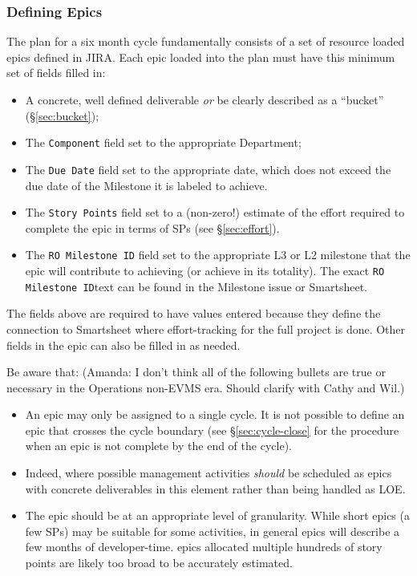 \subsubsection{Defining Epics}
\label{sec:planning-epics}

The plan for a six month \gls{cycle} fundamentally consists of a set of resource loaded \glspl{epic} defined in \gls{JIRA}.
Each \gls{epic} loaded into the plan must have this minimum set of fields filled in:

\begin{itemize}
\item
  A concrete, well defined deliverable \emph{or} be clearly described as a ``bucket'' (\S\ref{sec:bucket});
\item
  The \texttt{Component} field set to the appropriate Department;
\item
  The \texttt{Due Date} field set to the appropriate date, which does not exceed the due date of the Milestone it is labeled to achieve.
\item
  The \texttt{Story Points} field set to a (non-zero!) estimate of the effort required to complete the \gls{epic} in terms of \glspl{SP} (see \S\ref{sec:effort}).
\item
  The \texttt{RO Milestone ID} field set to the appropriate L3 or L2 milestone that the epic will contribute to achieving (or achieve in its totality).
  The exact \texttt{RO Milestone ID}text can be found in the Milestone issue or Smartsheet.
\end{itemize}

The fields above are required to have values entered because they define the connection to Smartsheet where effort-tracking for the full project is done. Other fields in the epic can also be filled in as needed. 

Be aware that: (Amanda: I don't think all of the following bullets are true or necessary in the Operations non-EVMS era.  Should clarify with Cathy and Wil.) 

\begin{itemize}
\item
  An \gls{epic} may only be assigned to a single \gls{cycle}.
  It is not possible to define an \gls{epic} that crosses the \gls{cycle} boundary (see \S\ref{sec:cycle-close} for the procedure when an \gls{epic} is not complete by the end of the \gls{cycle}).
\item
  Indeed, where possible management activities \emph{should} be scheduled as \glspl{epic} with concrete deliverables in this \gls{element} rather than being handled as \gls{LOE}.
\item
  The \gls{epic} should be at an appropriate level of granularity.
  While short \glspl{epic} (a few \glspl{SP}) may be suitable for some activities, in general \glspl{epic} will describe a few months of developer-time.
  \Glspl{epic} allocated multiple hundreds of \gls{story} points are likely too broad to be accurately estimated.
\end{itemize}


